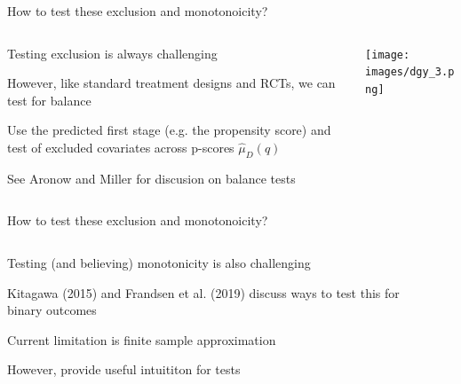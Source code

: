 \documentclass[notes,11pt, aspectratio=169]{beamer}
\newenvironment{wideitemize}{\itemize\addtolength{\itemsep}{10pt}}{\enditemize}
\begin{document}
\begin{frame}{How to test these exclusion and monotonoicity?}
  \begin{columns}[onlytextwidth, T] %
    \begin{column}{.5\textwidth}
      \begin{wideitemize}
      \item Testing exclusion is always challenging
      \item However, like standard treatment designs and RCTs, we can test for balance
      \item Use the predicted first stage (e.g. the propensity score)
        and test of excluded covariates across p-scores $\hat{\mu}_{D}(q)$
      \item See Aronow and Miller for discusion on balance tests
      \end{wideitemize}
    \end{column}%
    \hfill%
    \begin{column}{.5\textwidth}
      \texttt{[image: images/dgy\_3.png]}
    \end{column}%
  \end{columns}
  
\end{frame}

\begin{frame}{How to test these exclusion and monotonoicity?}
  \begin{columns}[onlytextwidth, T] %
    \begin{column}{.5\textwidth}
      \begin{wideitemize}
      \item<1-> Testing (and believing) monotonicity is also challenging
      \item<2-> Kitagawa (2015) and Frandsen et al. (2019) discuss ways to
        test this for binary outcomes
      \item<2-> Current limitation is finite sample approximation
      \item<2-> However, provide useful intuititon for tests
      \end{wideitemize}
    \end{column}%
    \hfill%
    \begin{column}{.5\textwidth}
    \end{column}%
  \end{columns}
\end{frame}
\end{document}
